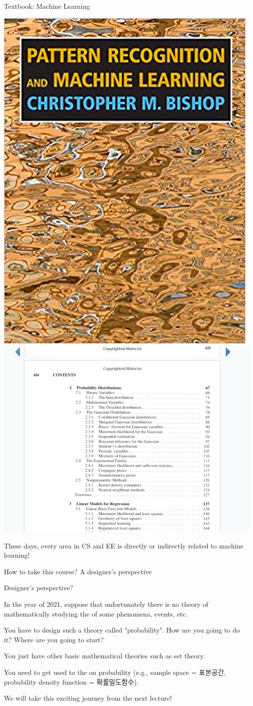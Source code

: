 \begin{frame}{Textbook: Machine Learning}

\centering
\includegraphics[height=5 cm]{L0_mltextbook.png}
\hspace{0.2cm}
\includegraphics[height=6 cm]{L0_mlcontents.png}

\bigskip

These days, every area in CS and EE is directly or indirectly related to machine learning!
\end{frame}

\begin{frame}{How to take this course? A designer's perspective}

\bci 

\item<1-> Designer's perspective?

\item<2-> In the year of 2021, suppose that unfortunately there is no theory of mathematically studying
the  of some phenomena, events, etc.  

\item<3-> You have to design such a theory called "probability". How are you going to do it? Where are you going to start? 


\item<3-> You just have other basic mathematical theories such as set theory.

\item<4-> You need to get used to the  on probability (e.g., sample space = 표본공간, probability density function = 확률밀도함수).

\item<5-> We will take this exciting journey from the next lecture!
\eci

\end{frame}


